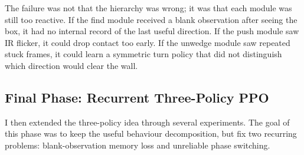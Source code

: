 \documentclass[11pt, oneside]{article}
\begin{document}
The failure was not that the hierarchy was wrong; it was that each module was still too reactive. If the find module received a blank observation after seeing the box, it had no internal record of the last useful direction. If the push module saw IR flicker, it could drop contact too early. If the unwedge module saw repeated stuck frames, it could learn a symmetric turn policy that did not distinguish which direction would clear the wall.

\subsection*{Final Phase: Recurrent Three-Policy PPO}
I then extended the three-policy idea through several experiments. The goal of this phase was to keep the useful behaviour decomposition, but fix two recurring problems: blank-observation memory loss and unreliable phase switching.
\end{document}
